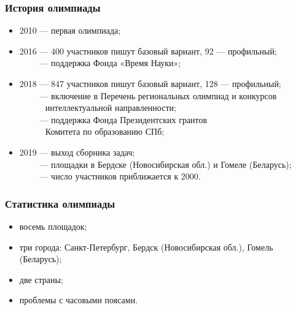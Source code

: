\begin{frame}\frametitle{История олимпиады}
\begin{itemize}
	\item 2010 — первая олимпиада;
	\item 2016 — 400 участников пишут базовый вариант, 92 --- профильный;\\
        $\phantom{2016}$ — поддержка Фонда «Время Науки»;
	\item 2018 — 847 участников пишут базовый вариант, 128 --- профильный;\\
        $\phantom{2018}$ — включение в Перечень региональных олимпиад и конкурсов\\
	$\phantom{2018 — }$\quad интеллектуальной направленности;\\
	$\phantom{2018}$ — поддержка Фонда Президентских грантов\\
	$\phantom{2018 — }$\quad Комитета по образованию СПб;\\
	\item 2019 — выход сборника задач;\\
        $\phantom{2019}$ — площадки в Бердске (Новосибирская обл.) и Гомеле (Беларусь);\\
        $\phantom{2019}$ — число участников приближается к 2000.
\end{itemize}\end{frame}

\begin{frame}\frametitle{Статистика олимпиады}
\begin{itemize}
        \item восемь площадок;\\
	\item три города: Санкт-Петербург, Бердск (Новосибирская обл.), Гомель (Беларусь);\\
        \item две страны;\\
        \item проблемы с часовыми поясами.
\end{itemize}\end{frame}
